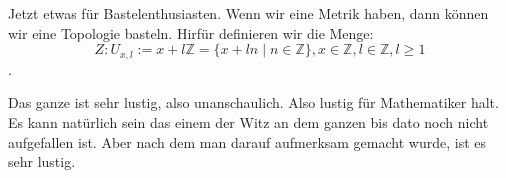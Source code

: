 \chapter{}
Jetzt etwas für Bastelenthusiasten.
Wenn wir eine Metrik haben, dann können wir eine Topologie basteln. 
Hirfür definieren wir die Menge:
$$Z : U_{x,l }:= x + l\mathbb{Z} = \{x + ln \mid n \in \mathbb{Z}\}, x \in \mathbb{Z}, l\in \mathbb{Z}, l \ge 1$$.


Das ganze ist sehr lustig, also unanschaulich. Also lustig für Mathematiker halt. 
Es kann natürlich sein das einem der Witz an dem ganzen bis dato noch nicht aufgefallen ist. 
Aber nach dem man darauf aufmerksam gemacht wurde, ist es sehr lustig.
\bigskip


